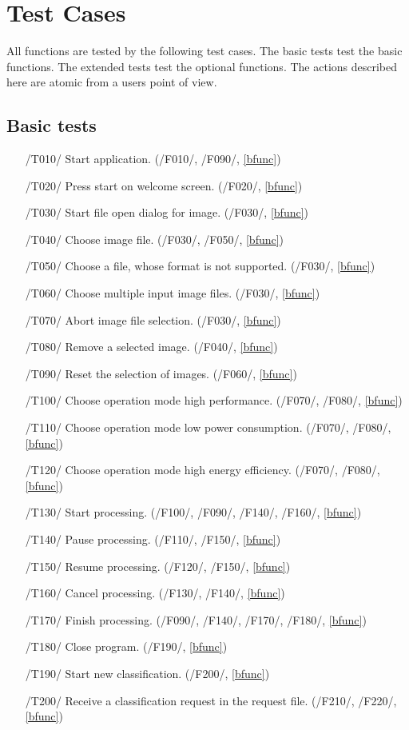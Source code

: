 \documentclass[parskip=full]{scrartcl}
\begin{document}
\pagebreak





\section {Test Cases}

All functions are tested by the following test cases. The basic tests test the basic functions. The extended tests test the optional functions. The actions described here are atomic from a users point of view.

\subsection {Basic tests}

\begin{itemize}
	\item[/T010/] Start application. (/F010/, /F090/, \ref{bfunc})
	\item[/T020/] Press start on welcome screen. (/F020/, \ref{bfunc})
	\item[/T030/] Start file open dialog for image. (/F030/, \ref{bfunc})
	\item[/T040/] Choose image file. (/F030/, /F050/, \ref{bfunc})
	\item[/T050/] Choose a file, whose format is not supported. (/F030/, \ref{bfunc})
	\item[/T060/] Choose multiple input image files. (/F030/, \ref{bfunc})
	\item[/T070/] Abort image file selection. (/F030/, \ref{bfunc})
	\item[/T080/] Remove a selected image. (/F040/, \ref{bfunc})
	\item[/T090/] Reset the selection of images. (/F060/, \ref{bfunc})
	\item[/T100/] Choose operation mode high performance. (/F070/, /F080/, \ref{bfunc})
	\item[/T110/] Choose operation mode low power consumption. (/F070/, /F080/, \ref{bfunc})
	\item[/T120/] Choose operation mode high energy efficiency. (/F070/, /F080/, \ref{bfunc})
	\item[/T130/] Start processing. (/F100/, /F090/, /F140/, /F160/, \ref{bfunc})
	\item[/T140/] Pause processing. (/F110/, /F150/, \ref{bfunc})
	\item[/T150/] Resume processing. (/F120/, /F150/, \ref{bfunc})
	\item[/T160/] Cancel processing. (/F130/, /F140/, \ref{bfunc})
	\item[/T170/] Finish processing. (/F090/, /F140/, /F170/, /F180/, \ref{bfunc})
	\item[/T180/] Close program. (/F190/, \ref{bfunc})
	\item[/T190/] Start new classification. (/F200/, \ref{bfunc})
	\item[/T200/] Receive a classification request in the request file. (/F210/, /F220/, \ref{bfunc})
\end{itemize}
\end{document}
